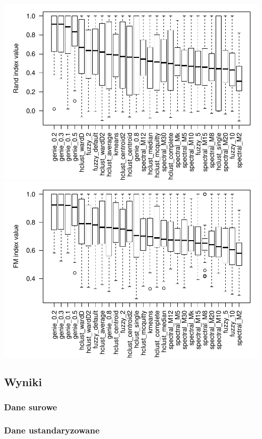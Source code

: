 \documentclass[]{article}
\begin{document}
\includegraphics{raport_files/figure-latex/unnamed-chunk-4-1.pdf}
\includegraphics{raport_files/figure-latex/unnamed-chunk-4-2.pdf}

\subsection{Wyniki}\label{wyniki}

\subsubsection{Dane surowe}\label{dane-surowe}

\subsubsection{Dane ustandaryzowane}\label{dane-ustandaryzowane}
\end{document}
